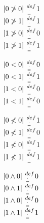 \documentclass[11pt]{article}
\def \attrdef{ {\hspace{1mm} def \atop {. \atop = } \hspace{1mm}} }
\begin{document}
\begin{center}
$
|0  \not > 0| \attrdef 1
$
\\ \vspace{4mm}
$
|0  \not > 1| \attrdef 1
$
\\ \vspace{4mm}
$
|1  \not > 0| \attrdef 0
$
\\ \vspace{4mm}
$
|1  \not > 1| \attrdef 1
$
\end{center}




\begin{center}
$
|0 < 0| \attrdef 0
$
\\ \vspace{4mm}
$
|0 <1| \attrdef 1
$
\\ \vspace{4mM}
$
|1 < 0| \attrdef 0
$
\\ \vspace{4mm}
$
|1 < 1| \attrdef 0
$
\end{center}






\begin{center}
$
|0 \not < 0| \attrdef 1
$
\\ \vspace{4mm}
$
|0 \not < 1| \attrdef 0
$
\\ \vspace{4mm}
$
|1 \not < 0| \attrdef 1
$
\\ \vspace{4mm}
$
|1 \not < 1| \attrdef 1
$
\end{center}












\begin{center}
$
|0 \land 0| \attrdef 0
$
\\ \vspace{4mm}
$
|0 \land 1| \attrdef 0
$
\\ \vspace{4mm}
$
|1 \land 0| \attrdef 0
$
\\ \vspace{4mm}
$
|1 \land 1| \attrdef 1
$
\end{center}
\end{document}
